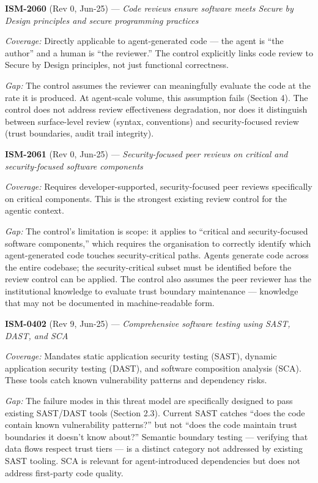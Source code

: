 \documentclass[a4paper,11pt]{report}
\begin{document}
\textbf{ISM-2060} (Rev 0, Jun-25) --- \emph{Code reviews ensure software
meets Secure by Design principles and secure programming practices}

\emph{Coverage:} Directly applicable to agent-generated code --- the
agent is ``the author'' and a human is ``the reviewer.'' The control
explicitly links code review to Secure by Design principles, not just
functional correctness.

\emph{Gap:} The control assumes the reviewer can meaningfully evaluate
the code at the rate it is produced. At agent-scale volume, this
assumption fails (Section 4). The control does not address review
effectiveness degradation, nor does it distinguish between surface-level
review (syntax, conventions) and security-focused review (trust
boundaries, audit trail integrity).

\textbf{ISM-2061} (Rev 0, Jun-25) --- \emph{Security-focused peer
reviews on critical and security-focused software components}

\emph{Coverage:} Requires developer-supported, security-focused peer
reviews specifically on critical components. This is the strongest
existing review control for the agentic context.

\emph{Gap:} The control's limitation is scope: it applies to ``critical
and security-focused software components,'' which requires the
organisation to correctly identify which agent-generated code touches
security-critical paths. Agents generate code across the entire
codebase; the security-critical subset must be identified before the
review control can be applied. The control also assumes the peer
reviewer has the institutional knowledge to evaluate trust boundary
maintenance --- knowledge that may not be documented in machine-readable
form.

\textbf{ISM-0402} (Rev 9, Jun-25) --- \emph{Comprehensive software
testing using SAST, DAST, and SCA}

\emph{Coverage:} Mandates static application security testing (SAST),
dynamic application security testing (DAST), and software composition
analysis (SCA). These tools catch known vulnerability patterns and
dependency risks.

\emph{Gap:} The failure modes in this threat model are specifically
designed to pass existing SAST/DAST tools (Section 2.3). Current SAST
catches ``does the code contain known vulnerability patterns?'' but not
``does the code maintain trust boundaries it doesn't know about?''
Semantic boundary testing --- verifying that data flows respect trust
tiers --- is a distinct category not addressed by existing SAST tooling.
SCA is relevant for agent-introduced dependencies but does not address
first-party code quality.
\end{document}

